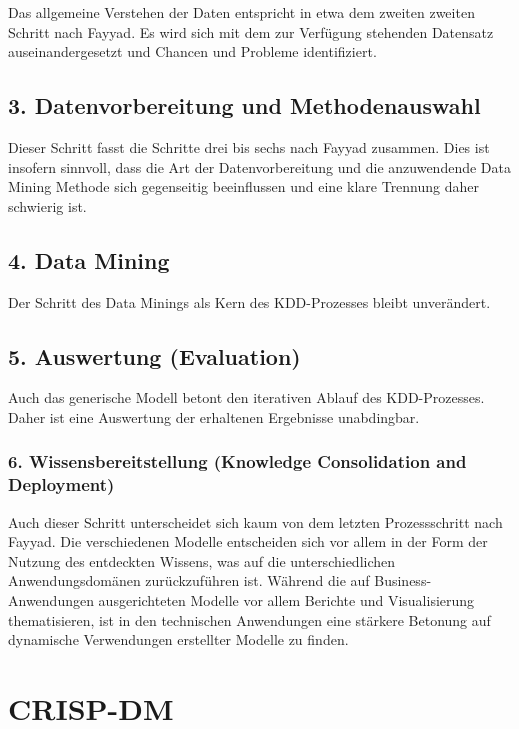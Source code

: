 Das allgemeine Verstehen der Daten entspricht in etwa dem zweiten zweiten Schritt nach Fayyad. Es wird sich mit dem zur Verfügung stehenden Datensatz auseinandergesetzt und Chancen und Probleme identifiziert.

\subsection{3. Datenvorbereitung und Methodenauswahl}%

Dieser Schritt fasst die Schritte drei bis sechs nach Fayyad zusammen. Dies ist insofern sinnvoll, dass die Art der Datenvorbereitung und die anzuwendende Data Mining Methode sich gegenseitig beeinflussen und eine klare Trennung daher schwierig ist.

\subsection{4. Data Mining}

Der Schritt des Data Minings als Kern des KDD-Prozesses bleibt unverändert.

\subsection{5. Auswertung (Evaluation)}

Auch das generische Modell betont den iterativen Ablauf des KDD-Prozesses. Daher ist eine Auswertung der erhaltenen Ergebnisse unabdingbar.

\subsubsection{6. Wissensbereitstellung (Knowledge Consolidation and Deployment)}

Auch dieser Schritt unterscheidet sich kaum von dem letzten Prozessschritt nach Fayyad. Die verschiedenen Modelle entscheiden sich vor allem in der Form der Nutzung des entdeckten Wissens, was auf die unterschiedlichen Anwendungsdomänen zurückzuführen ist. Während die auf Business-Anwendungen ausgerichteten Modelle vor allem Berichte und Visualisierung thematisieren, ist in den technischen Anwendungen eine stärkere Betonung auf dynamische Verwendungen erstellter Modelle zu finden.


\section{CRISP-DM} \label{CRISP}


